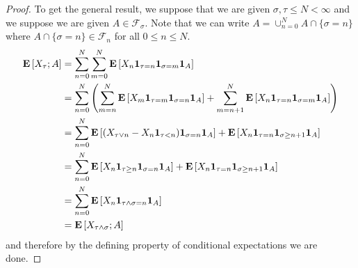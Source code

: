 \begin{proof}
To get the general result, we suppose that we are given $\sigma, \tau
\leq N < \infty$
and we suppose we are given $A \in \mathcal{F}_\sigma$.  Note that we
can write $A = \cup_{n=0}^N A \cap \lbrace \sigma=n\rbrace$ where
$A \cap \lbrace \sigma=n\rbrace \in \mathcal{F}_n$ for all $0 \leq n
\leq N$.
\begin{align*}
\textbf{E}\left[X_\tau ; A\right] &= \sum_{n=0}^N \sum_{m=0}^N \textbf{E}\left[X_n
  \textbf{1}_{\tau=n} \textbf{1}_{\sigma=m}
  \textbf{1}_{A}\right] \\
&= \sum_{n=0}^N \left (
\sum_{m=n}^N \textbf{E}\left[X_m
  \textbf{1}_{\tau=m} \textbf{1}_{\sigma=n} \textbf{1}_{A}\right]+
\sum_{m=n+1}^N \textbf{E}\left[X_n
  \textbf{1}_{\tau=n} \textbf{1}_{\sigma=m}\textbf{1}_{A}\right]
\right) \\
&=\sum_{n=0}^N \textbf{E}\left[(X_{\tau \vee n} - X_n
  \textbf{1}_{\tau < n})\textbf{1}_{\sigma=n}
  \textbf{1}_{A}\right] + 
\textbf{E}\left[X_n
  \textbf{1}_{\tau=n} \textbf{1}_{\sigma \geq
    n+1}\textbf{1}_{A}\right] \\
&=\sum_{n=0}^N \textbf{E}\left[X_n  \textbf{1}_{\tau\geq n}\textbf{1}_{\sigma=n}
  \textbf{1}_{A}\right] + 
\textbf{E}\left[X_n
  \textbf{1}_{\tau=n} \textbf{1}_{\sigma \geq
    n+1}\textbf{1}_{A}\right] \\
&=\sum_{n=0}^N \textbf{E}\left[X_n \textbf{1}_{\tau \wedge \sigma =
    n}  \textbf{1}_{A}\right] \\
&= \textbf{E}\left[X_{\tau \wedge \sigma} ; A\right]
\end{align*}
and therefore by the defining property of conditional expectations we
are done.


\end{proof}

